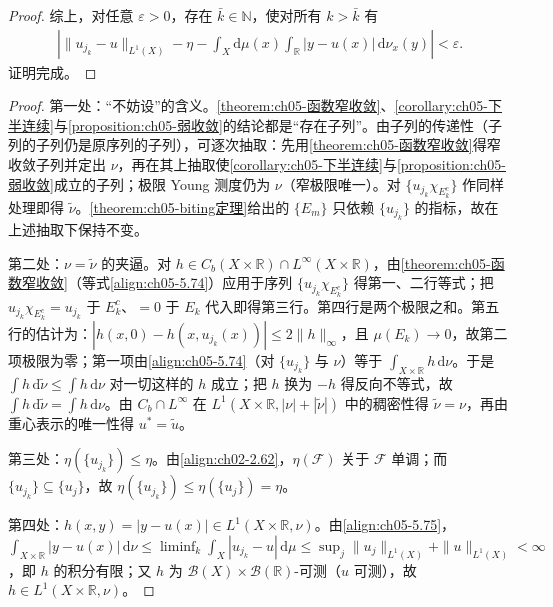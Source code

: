 \documentclass[../../main.tex]{subfiles}
\begin{document}
\begin{proof}
综上，对任意 $\varepsilon>0$，存在 $\bar k\in\mathbb{N}$，使对所有 $k>\bar k$ 有
\begin{align*}
\left|\|u_{j_k}-u\|_{L^1(X)}-\eta-\int_X\mathrm{d}\mu(x)\int_{\mathbb{R}}|y-u(x)|\,\mathrm{d}\nu_x(y)\right|<\varepsilon.
\end{align*}
证明完成。
\end{proof}

\begin{proof}
第一处：“不妨设”的含义。\cref{theorem:ch05-函数窄收敛}、\cref{corollary:ch05-下半连续}与\cref{proposition:ch05-弱收敛}的结论都是“存在子列”。由子列的传递性（子列的子列仍是原序列的子列），可逐次抽取：先用\cref{theorem:ch05-函数窄收敛}得窄收敛子列并定出 $\nu$，再在其上抽取使\cref{corollary:ch05-下半连续}与\cref{proposition:ch05-弱收敛}成立的子列；极限 Young 测度仍为 $\nu$（窄极限唯一）。对 $\{u_{j_k}\chi_{E_k^c}\}$ 作同样处理即得 $\tilde\nu$。\cref{theorem:ch05-biting定理}给出的 $\{E_m\}$ 只依赖 $\{u_{j_k}\}$ 的指标，故在上述抽取下保持不变。

第二处：$\nu=\tilde\nu$ 的夹逼。对 $h\in C_b(X\times\mathbb{R})\cap L^\infty(X\times\mathbb{R})$，由\cref{theorem:ch05-函数窄收敛}（等式\eqref{align:ch05-5.74}）应用于序列 $\{u_{j_k}\chi_{E_k^c}\}$ 得第一、二行等式；把 $u_{j_k}\chi_{E_k^c}=u_{j_k}$ 于 $E_k^c$、$=0$ 于 $E_k$ 代入即得第三行。第四行是两个极限之和。第五行的估计为：$|h(x,0)-h(x,u_{j_k}(x))|\leqslant2\|h\|_\infty$，且 $\mu(E_k)\to0$，故第二项极限为零；第一项由\eqref{align:ch05-5.74}（对 $\{u_{j_k}\}$ 与 $\nu$）等于 $\int_{X\times\mathbb{R}}h\,\mathrm{d}\nu$。于是 $\int h\,\mathrm{d}\tilde\nu\leqslant\int h\,\mathrm{d}\nu$ 对一切这样的 $h$ 成立；把 $h$ 换为 $-h$ 得反向不等式，故 $\int h\,\mathrm{d}\tilde\nu=\int h\,\mathrm{d}\nu$。由 $C_b\cap L^\infty$ 在 $L^1(X\times\mathbb{R},|\nu|+|\tilde\nu|)$ 中的稠密性得 $\tilde\nu=\nu$，再由重心表示的唯一性得 $u^*=\tilde u$。

第三处：$\eta(\{u_{j_k}\})\leqslant\eta$。由\eqref{align:ch02-2.62}，$\eta(\mathscr F)$ 关于 $\mathscr F$ 单调；而 $\{u_{j_k}\}\subseteq\{u_j\}$，故 $\eta(\{u_{j_k}\})\leqslant\eta(\{u_j\})=\eta$。

第四处：$h(x,y)=|y-u(x)|\in L^1(X\times\mathbb{R},\nu)$。由\eqref{align:ch05-5.75}，$\int_{X\times\mathbb{R}}|y-u(x)|\,\mathrm{d}\nu\leqslant\liminf_k\int_X|u_{j_k}-u|\,\mathrm{d}\mu\leqslant\sup_j\|u_j\|_{L^1(X)}+\|u\|_{L^1(X)}<\infty$，即 $h$ 的积分有限；又 $h$ 为 $\mathscr{B}(X)\times\mathscr{B}(\mathbb{R})$-可测（$u$ 可测），故 $h\in L^1(X\times\mathbb{R},\nu)$。


\end{proof}
\end{document}
